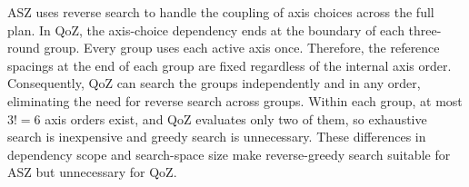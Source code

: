 ASZ uses reverse search to handle the coupling of axis choices across the full plan. In QoZ, the axis-choice dependency ends at the boundary of each three-round group. Every group uses each active axis once. Therefore, the reference spacings at the end of each group are fixed regardless of the internal axis order. Consequently, QoZ can search the groups independently and in any order, eliminating the need for reverse search across groups. Within each group, at most $3!=6$ axis orders exist, and QoZ evaluates only two of them, so exhaustive search is inexpensive and greedy search is unnecessary. These differences in dependency scope and search-space size make reverse-greedy search suitable for ASZ but unnecessary for QoZ.



